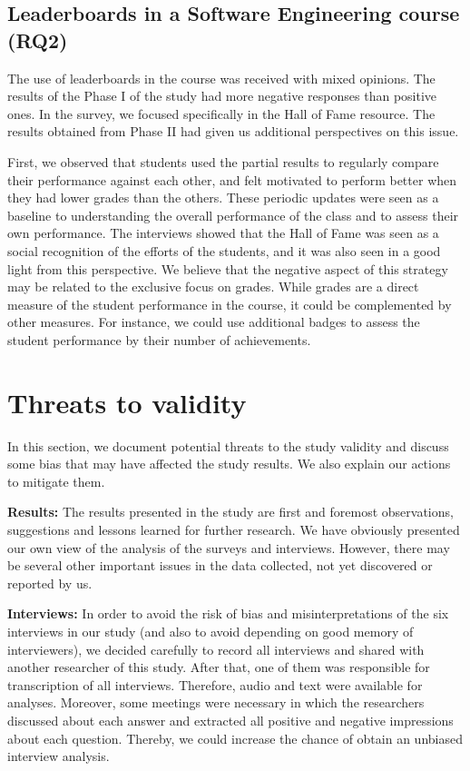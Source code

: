 \subsection{Leaderboards in a Software Engineering course (RQ2)}
\label{sec:gamificationdiscussionrq2}

The use of leaderboards in the course was received with mixed opinions. The results of the Phase I of the study had more negative responses than positive ones. In the survey, we focused specifically in the Hall of Fame resource. The results obtained from Phase II had given us additional perspectives on this issue.

First, we observed that students used the partial results to regularly compare their performance against each other, and felt motivated to perform better when they had lower grades than the others. These periodic updates were seen as a baseline to understanding the overall performance of the class and to assess their own performance. The interviews showed that the Hall of Fame was seen as a social recognition of the efforts of the students, and it was also seen in a good light from this perspective. We believe that the negative aspect of this strategy may be related to the exclusive focus on grades. While grades are a direct measure of the student performance in the course, it could be complemented by other measures. For instance, we could use additional badges to assess the student performance by their number of achievements.

\section{Threats to validity}
\label{sec:gamificationthreats}

In this section, we document potential threats to the study validity and discuss some bias that may have affected the study results. We also explain our actions to mitigate them.

\textbf{Results:} The results presented in the study are first and foremost observations, suggestions and lessons learned for further research. We have obviously presented our own view of the analysis of the surveys and interviews. However, there may be several other important issues in the data collected, not yet discovered or reported by us. 

\textbf{Interviews:} In order to avoid the risk of bias and misinterpretations of the six interviews in our study (and also to avoid depending on good memory of interviewers), we decided carefully to record all interviews and shared with another researcher of this study. After that, one of them was responsible for transcription of all interviews. Therefore, audio and text were available for analyses. Moreover, some meetings were necessary in which the researchers discussed about each answer and extracted all positive and negative impressions about each question. Thereby, we could increase the chance of obtain an unbiased interview analysis.

